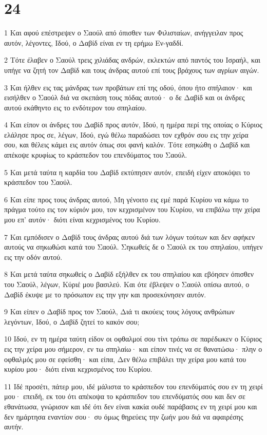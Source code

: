 \chapter{24}

\par 1 Και αφού επέστρεψεν ο Σαούλ από όπισθεν των Φιλισταίων, ανήγγειλαν προς αυτόν, λέγοντες, Ιδού, ο Δαβίδ είναι εν τη ερήμω Εν-γαδδί.
\par 2 Τότε έλαβεν ο Σαούλ τρεις χιλιάδας ανδρών, εκλεκτών από παντός του Ισραήλ, και υπήγε να ζητή τον Δαβίδ και τους άνδρας αυτού επί τους βράχους των αγρίων αιγών.
\par 3 Και ήλθεν εις τας μάνδρας των προβάτων επί της οδού, όπου ήτο σπήλαιον· και εισήλθεν ο Σαούλ διά να σκεπάση τους πόδας αυτού· ο δε Δαβίδ και οι άνδρες αυτού εκάθηντο εις το ενδότερον του σπηλαίου.
\par 4 Και είπον οι άνδρες του Δαβίδ προς αυτόν, Ιδού, η ημέρα περί της οποίας ο Κύριος ελάλησε προς σε, λέγων, Ιδού, εγώ θέλω παραδώσει τον εχθρόν σου εις την χείρα σου, και θέλεις κάμει εις αυτόν όπως σοι φανή καλόν. Τότε εσηκώθη ο Δαβίδ και απέκοψε κρυφίως το κράσπεδον του επενδύματος του Σαούλ.
\par 5 Και μετά ταύτα η καρδία του Δαβίδ εκτύπησεν αυτόν, επειδή είχεν αποκόψει το κράσπεδον του Σαούλ.
\par 6 Και είπε προς τους άνδρας αυτού, Μη γένοιτο εις εμέ παρά Κυρίου να κάμω το πράγμα τούτο εις τον κύριόν μου, τον κεχρισμένον του Κυρίου, να επιβάλω την χείρα μου επ' αυτόν· διότι είναι κεχρισμένος του Κυρίου.
\par 7 Και εμπόδισεν ο Δαβίδ τους άνδρας αυτού διά των λόγων τούτων και δεν αφήκεν αυτούς να σηκωθώσι κατά του Σαούλ. Σηκωθείς δε ο Σαούλ εκ του σπηλαίου, υπήγεν εις την οδόν αυτού.
\par 8 Και μετά ταύτα σηκωθείς ο Δαβίδ εξήλθεν εκ του σπηλαίου και εβόησεν όπισθεν του Σαούλ, λέγων, Κύριέ μου βασιλεύ. Και ότε έβλεψεν ο Σαούλ οπίσω αυτού, ο Δαβίδ έκυψε με το πρόσωπον εις την γην και προσεκύνησεν αυτόν.
\par 9 Και είπεν ο Δαβίδ προς τον Σαούλ, Διά τι ακούεις τους λόγους ανθρώπων λεγόντων, Ιδού, ο Δαβίδ ζητεί το κακόν σου;
\par 10 Ιδού, εν τη ημέρα ταύτη είδον οι οφθαλμοί σου τίνι τρόπω σε παρέδωκεν ο Κύριος εις την χείρα μου σήμερον, εν τω σπηλαίω· και είπον τινές να σε θανατώσω· πλην ο οφθαλμός μου σε εφείσθη· και είπα, Δεν θέλω επιβάλει την χείρα μου κατά του κυρίου μου· διότι είναι κεχρισμένος του Κυρίου.
\par 11 Ιδέ προσέτι, πάτερ μου, ιδέ μάλιστα το κράσπεδον του επενδύματός σου εν τη χειρί μου· επειδή, εκ του ότι απέκοψα το κράσπεδον του επενδύματός σου και δεν σε εθανάτωσα, γνώρισον και ιδέ ότι δεν είναι κακία ουδέ παράβασις εν τη χειρί μου και δεν ημάρτησα εναντίον σου· συ όμως θηρεύεις την ζωήν μου διά να αφαιρέσης αυτήν.
